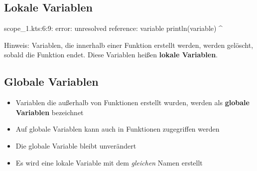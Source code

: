 \subsection{Lokale Variablen}
\begin{frame}[fragile]
    \slidehead
    \vspace{-1em}
    \pause
    \vspace{-1em}
    \begin{commandshell}[fontsize=\footnotesize][minted language=text,top=0cm,bottom=0cm]
        scope_1.kts:6:9: error: unresolved reference: variable
        println(variable)
                ^
    \end{commandshell}
    \vspace{-1em}
    \begin{block}{Hinweis:}
        Variablen, die innerhalb einer Funktion erstellt werden, werden gelöscht, sobald die Funktion endet.
        Diese Variablen heißen \textbf{lokale Variablen}.
    \end{block}
\end{frame}

\subsection{Globale Variablen}
\begin{frame}
    \slidehead
    \begin{itemize}
        \item Variablen die außerhalb von Funktionen erstellt wurden, werden als \textbf{globale Variablen} bezeichnet
        \item Auf globale Variablen kann auch in Funktionen zugegriffen werden
    \end{itemize}
\end{frame}

\begin{frame}
    \slidehead
    \begin{itemize}
        \item Die globale Variable  bleibt unverändert
        \item Es wird eine lokale Variable mit dem \textit{gleichen} Namen erstellt
    \end{itemize}
\end{frame}

\livecoding


